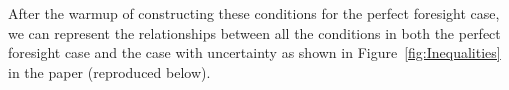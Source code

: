 \documentclass[\econtexRoot/BufferStockTheory]{subfiles}
\begin{document}
After the warmup of constructing these conditions for the perfect foresight case, we can represent the relationships between all the conditions in both the perfect foresight case and the case with uncertainty as shown in Figure~\ref{fig:Inequalities} in the paper (reproduced below).

\renewcommand{\figName}{Inequalities} %
\renewcommand{\figFile}{\figName} %
\hypertarget{\figFile}{}
\hypertarget{\figName}{}

\onlyinsubfile{}
\end{document}
